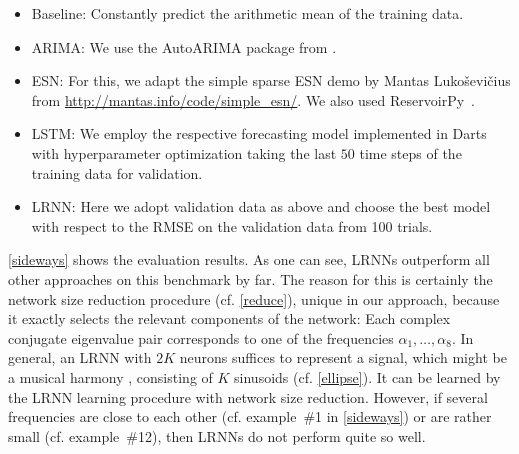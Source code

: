 \documentclass[twoside,11pt]{article}
\theoremstyle{definition}
\begin{document}
\begin{itemize}
  \item Baseline: Constantly predict the arithmetic mean of the training data.
  \item ARIMA: We use the AutoARIMA package from \citet{HK08}.
  \item ESN: For this, we adapt the simple sparse ESN demo by Mantas
	Luko\v{s}evi\v{c}ius from \url{http://mantas.info/code/simple_esn/}.
	We also used ReservoirPy~\citep{TPDH20}.
  \item LSTM: We employ the respective forecasting model implemented in Darts
	with hyperparameter optimization taking the last $50$ time steps of the
	training data for validation.
  \item LRNN: Here we adopt validation data as above and choose the best model
	with respect to the RMSE on the validation data from 100 trials.
\end{itemize}

\cref{sideways} shows the evaluation results. As one can see, LRNNs outperform
all other approaches on this benchmark by far. The reason for this is certainly
the network size reduction procedure (cf. \cref{reduce}), unique in our approach,
because it exactly selects the relevant components of the network: Each complex
conjugate
eigenvalue pair corresponds to one of the frequencies $\alpha_1,\dots,\alpha_8$.
In general, an LRNN with $2K$ neurons suffices to represent a signal, which
might be a musical harmony \citep{Sto17b}, consisting of $K$ sinusoids (cf.
\cref{ellipse}). It can be learned by the LRNN learning procedure with network
size reduction. However, if several frequencies are close to each other (cf.
example~\#1 in \cref{sideways}) or are rather small (cf. example~\#12), then
LRNNs do not perform quite so well.
	
\end{document}
